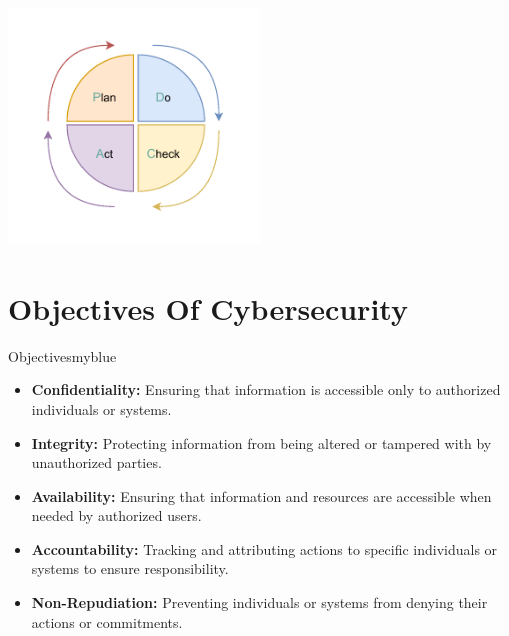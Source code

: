 \begin{center}
    \includegraphics[width=0.5\textwidth]{Chapters/Diagram/Introduction/pdca.drawio.pdf}
\end{center}

\newpage
\section{Objectives Of Cybersecurity}
\begin{prettyBox}{Objectives}{myblue}
\begin{itemize}
\item \textbf{Confidentiality:} Ensuring that information is accessible only
to authorized individuals or systems.
\item \textbf{Integrity:} Protecting information from being altered or tampered
with by unauthorized parties.   
\item \textbf{Availability:} Ensuring that information and resources are 
accessible when needed by authorized users.    
\item \textbf{Accountability:} Tracking and attributing actions to specific
individuals or systems to ensure responsibility.    
\item \textbf{Non-Repudiation:} Preventing individuals or systems from
denying their actions or commitments.
\end{itemize}
\end{prettyBox}

\vspace{0.75cm}

